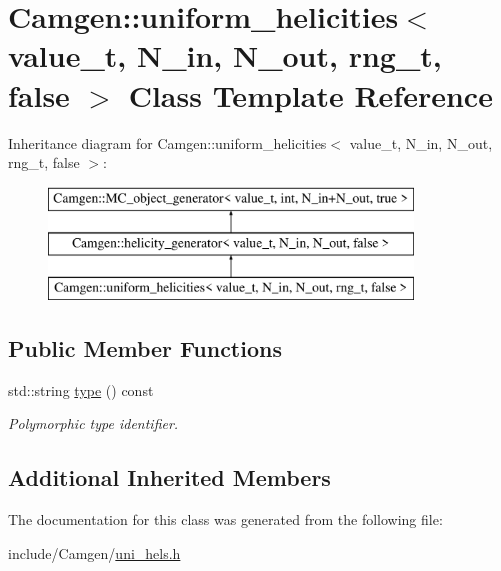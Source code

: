 \hypertarget{a00547}{\section{Camgen\-:\-:uniform\-\_\-helicities$<$ value\-\_\-t, N\-\_\-in, N\-\_\-out, rng\-\_\-t, false $>$ Class Template Reference}
\label{a00547}
}
Inheritance diagram for Camgen\-:\-:uniform\-\_\-helicities$<$ value\-\_\-t, N\-\_\-in, N\-\_\-out, rng\-\_\-t, false $>$\-:\begin{figure}[H]
\begin{center}
\leavevmode
\includegraphics[height=3.000000cm]{a00547}
\end{center}
\end{figure}
\subsection*{Public Member Functions}
\begin{DoxyCompactItemize}
\item 
\hypertarget{a00547_a88f74a72125079a1c17026b8d09ae7f4}{std\-::string \hyperlink{a00547_a88f74a72125079a1c17026b8d09ae7f4}{type} () const }\label{a00547_a88f74a72125079a1c17026b8d09ae7f4}

\begin{DoxyCompactList}\small\item\em Polymorphic type identifier. \end{DoxyCompactList}\end{DoxyCompactItemize}
\subsection*{Additional Inherited Members}


The documentation for this class was generated from the following file\-:\begin{DoxyCompactItemize}
\item 
include/\-Camgen/\hyperlink{a00795}{uni\-\_\-hels.\-h}\end{DoxyCompactItemize}
